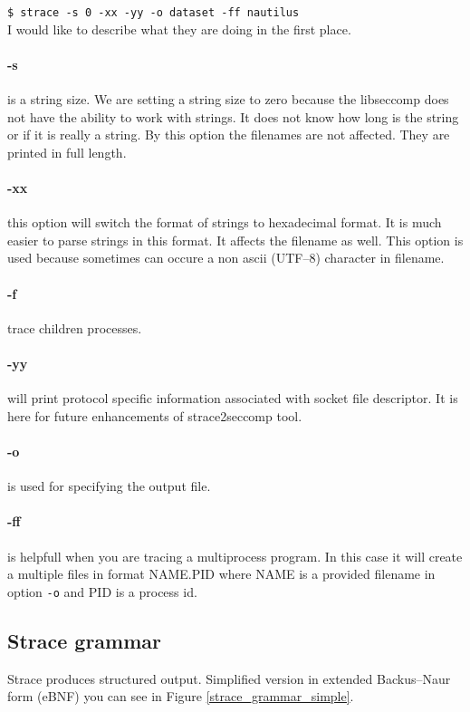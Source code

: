 \texttt{\$ strace -s 0 -xx -yy -o dataset -ff nautilus }
\\
I would like to describe what they are doing in the first place.\cite{strace_man}

\paragraph{-s} is a string size. We are setting a string size to zero because the
libseccomp does not have the ability to work with strings. It does not know how long is
the string or if it is really a string. By this option the filenames are not affected.
They are printed in full length.

\paragraph{-xx} this option will switch the format of strings to hexadecimal format.
It is much easier to parse strings in this format. It affects the filename as well.
This option is used because sometimes can occure a non ascii (UTF--8) character in filename.

\paragraph{-f} trace children processes.

\paragraph{-yy} will print protocol specific information associated with socket file descriptor.
It is here for future enhancements of strace2seccomp tool.

\paragraph{-o} is used for specifying the output file.

\paragraph{-ff} is helpfull when you are tracing a multiprocess program.
In this case it will create a multiple files in format
NAME.PID where NAME is a provided filename in option \texttt{-o} and PID is a process id.



\subsection{Strace grammar}
Strace produces structured output. Simplified version in extended Backus–Naur form (eBNF)\cite{ISO14977}
you can see in Figure \ref{strace_grammar_simple}.

